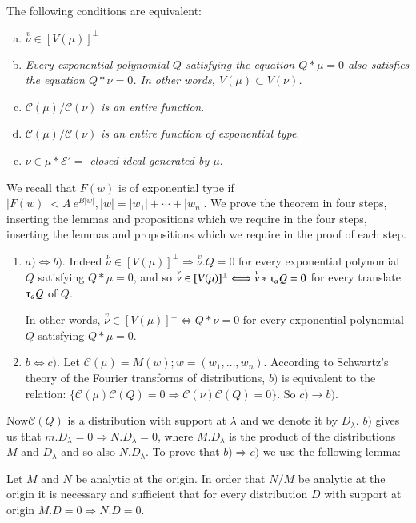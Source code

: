 \begin{theorem}\label{chap23:thm2}%
 The following conditions are equivalent: 
 \begin{enumerate}[a)]
 \item $\overset{v}{\nu} \in [V(\mu)]^{\perp}$
 \item {\em{Every exponential polynomial $Q$ satisfying the equation
  $Q * \mu = 0$ also satisfies the equation $Q * \nu = 0$. In
  other words, $V(\mu) \subset V(\nu)$.}} 
 \item $\mathscr{C}(\mu) / \mathscr{C}(\nu)$ {\em{is an entire function}}.
 \item $\mathscr{C}(\mu)/ \mathscr{C}(\nu)$ {\em{is an entire
  function of exponential type}}. 
 \item $\nu \in \mu * \mathscr{E}'= $ {\em{ closed ideal generated by $\mu$}}.
 \end{enumerate}
\end{theorem}

We recall that $F(w)$ is of exponential type if $|F(w)| < A ~
e^{B|w|}, | w | = |w_1| + \cdots + | w_n |$. We prove the theorem in
four steps, inserting the lemmas and propositions which we require in
the four steps, inserting the lemmas and propositions which we require
in the proof of each step. 
\begin{enumerate}
\item $a) \Longleftrightarrow b)$. Indeed $\overset{\nu}{\nu} \in
 [V(\mu)]^\perp \Rightarrow \overset{v}{\nu}. Q = 0$ for every
 exponential polynomial $Q$ satisfying $Q * \mu = 0$, and so
 $\overset{\nu}{\nu} \in [V(\mu)]^\perp \Longleftrightarrow
 \overset{v}{\nu} * \tauup_a Q = 0$ for every translate $\tauup_a Q $
 of $Q$. 

 In other words, $\overset{v}{\nu} \in [V(\mu)]^\perp
 \Longleftrightarrow Q * \nu = 0$ for every exponential polynomial
 $Q$ satisfying $Q * \mu = 0$. 
\item $b \Longleftrightarrow c)$. Let $\mathscr{C}(\mu) = M(w); w =
 (w_1, \ldots, w_n)$. According to Schwartz's theory of the Fourier
 transforms of distributions, $b)$ is equivalent to the relation:
 $\{\mathscr{C} (\mu)\mathscr{C}(Q) = 0 \Rightarrow \mathscr{C}(\nu)
 \mathscr{C}(Q) = 0 \}$. So $c) \rightarrow b)$. 
\end{enumerate}

Now\pageoriginale $\mathscr{C}(Q)$ is a distribution with support at $\lambda$ and
we denote it by $D_\lambda$. $b)$ gives us that $m.D_\lambda= 0
\Rightarrow N.D_\lambda = 0$, where $M.D_\lambda$ is the product of
the distributions $M$ and $D_\lambda$ and so also $N.D_\lambda$. To
prove that $b) \Rightarrow c)$ we use the following lemma: 
\begin{lemma*}%
 Let $M$ and $N$ be analytic at the origin. In order that $N/M$ be
 analytic at the origin it is necessary and sufficient that for
 every distribution $D$ with support at origin $M.D = 0 \Rightarrow
 N.D = 0$. 
\end{lemma*}

